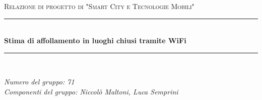 \begin{titlepage}
  \newcommand{\HRule}{\rule{\linewidth}{0.5mm}}

  \center

  \textsc{\Large Relazione di progetto di "Smart City e Tecnologie Mobili"}\\[0.5cm]

  \HRule \\[0.4cm]
  { \huge \bfseries Stima di affollamento in luoghi chiusi tramite WiFi}\\[0.4cm]
  \HRule \\[1.5cm]

  \vfill

  \begin{flushleft}
  \emph{Numero del gruppo: 71}\\[1cm]
  \emph{Componenti del gruppo: Niccolò Maltoni, Luca Semprini}\\[3cm]
  \end{flushleft}
\end{titlepage}
